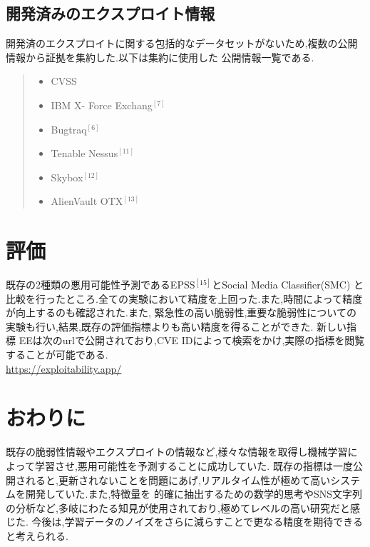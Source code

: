 \documentclass[submit,techreq,noauthor]{eco}	%
\begin{document}
\subsection*{開発済みのエクスプロイト情報}
開発済のエクスプロイトに関する包括的なデータセットがないため,複数の公開情報から証拠を集約した.以下は集約に使用した
公開情報一覧である.
\begin{quote}
  \begin{itemize}
   \item CVSS
   \item IBM X- Force Exchang\begin{math}^{[7]}\end{math}
   \item Bugtraq\begin{math}^{[6]}\end{math}
   \item Tenable Nessus\begin{math}^{[11]}\end{math}
   \item Skybox\begin{math}^{[12]}\end{math}
   \item AlienVault OTX\begin{math}^{[13]}\end{math}
  \end{itemize}
\end{quote}

\section{評価}
既存の2種類の悪用可能性予測であるEPSS\begin{math}^{[15]}\end{math}とSocial Media Classifier(SMC)
と比較を行ったところ.全ての実験において精度を上回った.また,時間によって精度が向上するのも確認された.また,
緊急性の高い脆弱性,重要な脆弱性についての実験も行い,結果,既存の評価指標よりも高い精度を得ることができた.
新しい指標
EEは次のurlで公開されており,CVE IDによって検索をかけ,実際の指標を閲覧することが可能である.\\\url{https://exploitability.app/}

\section{おわりに}
既存の脆弱性情報やエクスプロイトの情報など,様々な情報を取得し機械学習によって学習させ,悪用可能性を予測することに成功していた.
既存の指標は一度公開されると,更新されないことを問題にあげ,リアルタイム性が極めて高いシステムを開発していた.また,特徴量を
的確に抽出するための数学的思考やSNS文字列の分析など,多岐にわたる知見が使用されており,極めてレベルの高い研究だと感じた.
今後は,学習データのノイズをさらに減らすことで更なる精度を期待できると考えられる.
\end{document}
